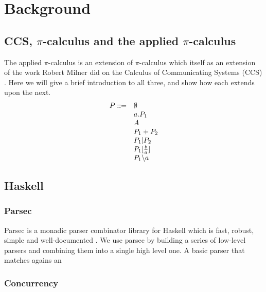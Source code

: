 \section{Background}
\subsection{CCS, $\pi$-calculus and the applied $\pi$-calculus}

The applied $\pi$-calculus \cite{af01} is an extension of $\pi$-calculus \cite{mpw92} which itself as an extension of the work Robert Milner did on the Calculus of Communicating Systems (CCS) \cite{m82}. Here we will give a brief introduction to all three, and show how each extends upon the next.
\[
\begin{array}[b]{l l}
 P ::= & \emptyset \\
  &a.P_{1}\\
  &A\\
  &P_{1} + P_{2} \\
  &P_{1} | P_{2} \\
  &P_{1} [\frac{b}{a}]\\
  &P_{1} \backslash a 
\end{array}
\]

\subsection{Haskell}



\subsubsection{Parsec}

Parsec is a monadic parser combinator library for Haskell which is fast, robust, simple and well-documented \cite{lm01}. We use parsec by building a series of low-level parsers and combining them into a single high level one.
A basic parser that matches agains an 


\subsubsection{Concurrency}
